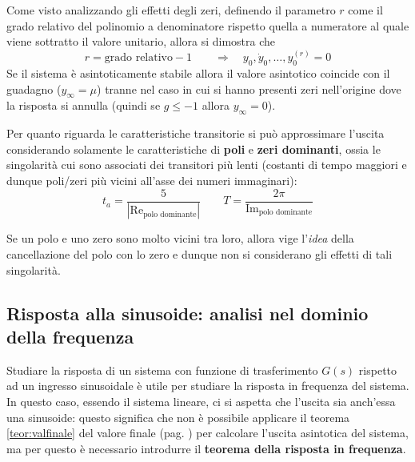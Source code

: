 			Come visto analizzando gli effetti degli zeri, definendo il parametro $r$ come il grado relativo del polinomio a denominatore rispetto quella a numeratore al quale viene sottratto il valore unitario, allora si dimostra che
			\[ r = \textrm{grado relativo} - 1 \qquad \Rightarrow \quad y_0,\dot y_0 ,\dots, y_0^{(r)} = 0 \]
			Se il  sistema è asintoticamente stabile allora il valore asintotico coincide con il guadagno  ($y_\infty = \mu$) tranne nel caso in cui si hanno presenti zeri nell'origine dove la risposta si annulla (quindi se $g\leq -1$ allora $y_\infty = 0$). \\
			\begin{concetto}
				Per quanto riguarda le caratteristiche transitorie si può approssimare l'uscita considerando solamente le caratteristiche di \textbf{poli} e \textbf{zeri dominanti}, ossia le singolarità cui sono associati dei transitori più lenti (costanti di tempo maggiori e dunque poli/zeri più vicini all'asse dei numeri immaginari):
				\[ t_a = \frac{5}{\left|\textrm{Re}_\textrm{polo dominante}\right|} \qquad T = \frac{2\pi}{\textrm{Im}_\textrm{polo dominante}} \]
			\end{concetto}
			\begin{osservazione}
				Se un polo e uno zero sono molto vicini tra loro, allora vige l'\textit{idea} della cancellazione del polo con lo zero e dunque non si considerano gli effetti di tali singolarità.
			\end{osservazione}
			
	\subsection{Risposta alla sinusoide: analisi nel dominio della frequenza}
		Studiare la risposta di un sistema con funzione di trasferimento $G(s)$ rispetto ad un ingresso sinusoidale è utile per studiare la risposta in frequenza del sistema. In questo caso, essendo il sistema lineare, ci si aspetta che l'uscita sia anch'essa una sinusoide: questo significa che non è possibile applicare il teorema \ref{teor:valfinale} del valore finale (pag. \pageref{teor:valfinale}) per calcolare l'uscita asintotica del sistema, ma per questo è necessario introdurre il \textbf{teorema della risposta in frequenza}.
		
